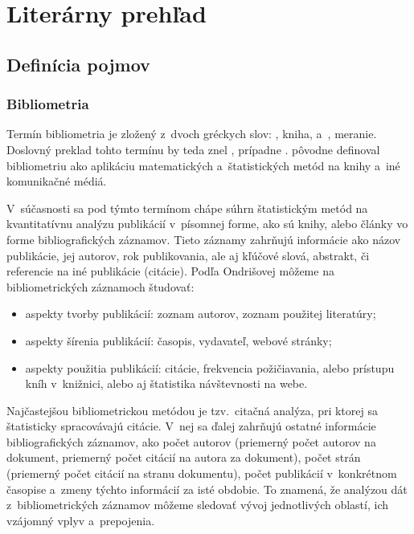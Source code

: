 \chapter{Literárny prehľad}
\label{chap:review}

\section{Definícia pojmov}

\subsection{Bibliometria}

Termín bibliometria je zložený z~dvoch gréckych slov:
, kniha,
a~, meranie.  Doslovný
preklad tohto termínu by teda znel , prípadne .
\citet{Pritchard1969} pôvodne definoval bibliometriu ako aplikáciu matematických
a~štatistických metód na knihy a~iné komunikačné médiá.

V~súčasnosti sa pod týmto termínom chápe súhrn štatistickým metód na
kvantitatívnu analýzu publikácií v~písomnej forme, ako sú knihy, alebo články vo
forme bibliografických záznamov.  Tieto záznamy zahrňujú informácie ako názov
publikácie, jej autorov, rok publikovania, ale aj kľúčové slová, abstrakt, či
referencie na iné publikácie (citácie).  Podľa Ondrišovej
\citeyearpar{Ondrisova2011} môžeme na bibliometrických záznamoch študovať:

\begin{itemize}
\item aspekty tvorby publikácií: zoznam autorov, zoznam použitej literatúry;
\item aspekty šírenia publikácií: časopis, vydavateľ, webové stránky;
\item aspekty použitia publikácií: citácie, frekvencia požičiavania, alebo
  prístupu kníh v~knižnici, alebo aj štatistika návštevnosti na webe.

\end{itemize}

Najčastejšou bibliometrickou metódou je tzv.~citačná analýza, pri ktorej sa štatisticky spracovávajú citácie.  V~nej sa ďalej
zahrňujú ostatné informácie bibliografických záznamov, ako počet autorov
(priemerný počet autorov na dokument, priemerný počet citácií na autora za
dokument), počet strán (priemerný počet citácií na stranu dokumentu), počet
publikácií v~konkrétnom časopise a~zmeny týchto informácií za isté obdobie.  To
znamená, že analýzou dát z~bibliometrických záznamov môžeme sledovať vývoj
jednotlivých oblastí, ich vzájomný vplyv a~prepojenia.

